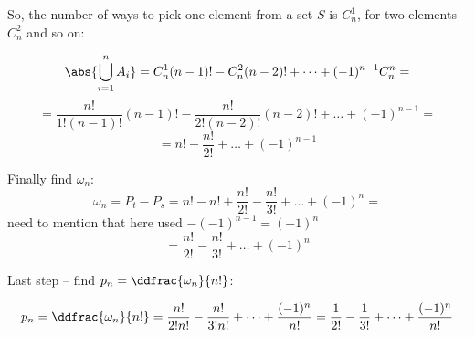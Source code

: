 So, the number of ways to pick one element from a set \(S\) is \( C_{n}^{1} \), for two elements --
\( C_{n}^{2} \) and so on:

\[ \abs{\bigcup_{i=1}^{n} A_i } = C_{n}^{1} (n-1)! - C_{n}^{2} (n-2)! + \dots + (-1)^{n-1}
    C_{n}^{n} = \]
\[ = \frac{n!}{1! (n-1)!} (n-1)! - \frac{n!}{2! (n-2)!} (n-2)! + \dots + (-1)^{n-1} = \]
\[ = n! - \frac{n!}{2!} + \dots + (-1)^{n-1} \]

Finally find \(\omega_n\):
\[ \omega_n = P_t - P_s = n! - n! + \frac{n!}{2!} - \frac{n!}{3!} + \dots + (-1)^{n} = \]
need to mention that here used \( - (-1)^{n-1} = (-1)^{n} \)
\[ = \frac{n!}{2!} - \frac{n!}{3!} + \dots + (-1)^{n} \]

Last step -- find \( p_n = \ddfrac{\omega_n}{n!} \):

\[ p_n = \ddfrac{\omega_n}{n!} = \frac{n!}{2! n!} - \frac{n!}{3! n!} + \dots + \frac{(-1)^{n}}{n!} =
\frac{1}{2!} - \frac{1}{3!} + \dots + \frac{(-1)^{n}}{n!} \]


